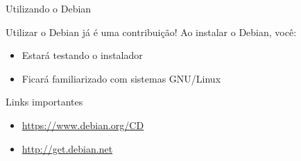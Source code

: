 \documentclass[10pt, compress, aspectratio=169]{beamer}
\begin{document}
\begin{frame}{Utilizando o Debian}

  \begin{exampleblock}{Utilizar o Debian já é uma contribuição! Ao instalar o Debian, você:}
      \begin{itemize}
        \item Estará testando o instalador
        \item Ficará familiarizado com sistemas GNU/Linux
      \end{itemize}
  \end{exampleblock}

  \pause

  \begin{exampleblock}{Links importantes}
    \begin{itemize}
      \item \url{https://www.debian.org/CD}
      \item \url{http://get.debian.net}
    \end{itemize}
  \end{exampleblock}


\end{frame}
\end{document}
